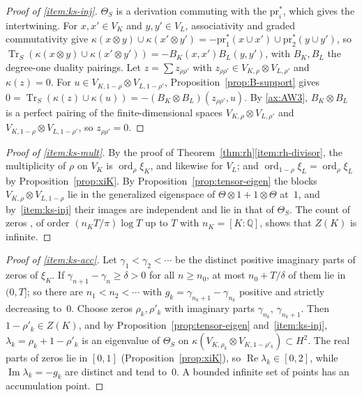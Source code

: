 \documentclass[11pt]{amsart}
\theoremstyle{plain}
\theoremstyle{definition}
\theoremstyle{remark}
\numberwithin{equation}{section}
\newcommand{\Q}{\mathbb{Q}}
\DeclareMathOperator{\Tr}{Tr}
\DeclareMathOperator{\Ima}{Im}
\DeclareMathOperator{\Rea}{Re}
\DeclareMathOperator{\ord}{ord}
\renewcommand{\Re}{\Rea}
\renewcommand{\Im}{\Ima}
\begin{document}
\begin{proof}[Proof of \ref{item:ks-inj}]
$\Theta_S$ is a derivation commuting with the $\mathrm{pr}_i^*$, which
gives the intertwining. For $x,x'\in V_K$ and $y,y'\in V_L$, associativity
and graded commutativity give $\kappa(x\otimes y)\cup
\kappa(x'\otimes y')=-\mathrm{pr}_1^*(x\cup x')\cup\mathrm{pr}_2^*
(y\cup y')$, so $\Tr_S(\kappa(x\otimes y)\cup\kappa(x'\otimes y'))=
-B_{K}(x,x')B_{L}(y,y')$, with $B_K,B_L$ the degree-one duality
pairings. Let $z=\sum z_{\rho\rho'}$ with $z_{\rho\rho'}\in
V_{K,\rho}\otimes V_{L,\rho'}$ and $\kappa(z)=0$. For $u\in V_{K,1-\rho}\otimes
V_{L,1-\rho'}$, Proposition~\ref{prop:B-support} gives
$0=\Tr_S(\kappa(z)\cup\kappa(u))=-(B_K\otimes B_L)(z_{\rho\rho'},u)$.
By \ref{ax:AW3}, $B_K\otimes B_L$ is a perfect pairing of the
finite-dimensional spaces $V_{K,\rho}\otimes V_{L,\rho'}$ and
$V_{K,1-\rho}\otimes V_{L,1-\rho'}$, so $z_{\rho\rho'}=0$.
\end{proof}

\begin{proof}[Proof of \ref{item:ks-mult}]
By the proof of Theorem~\ref{thm:rh}\ref{item:rh-divisor}, the
multiplicity of $\rho$ on $V_K$ is $\ord_\rho\xi_K$, and likewise for
$V_L$; and $\ord_{1-\rho}\xi_L=\ord_\rho\xi_L$ by
Proposition~\ref{prop:xiK}. By Proposition~\ref{prop:tensor-eigen} the
blocks $V_{K,\rho}\otimes V_{L,1-\rho}$ lie in the generalized eigenspace of
$\Theta\otimes1+1\otimes\Theta$ at~$1$, and by~\ref{item:ks-inj} their
images are independent and lie in that of $\Theta_S$. The count of
zeros \cite[p.~1]{HasanalizadeShenWong2021CountingZeros}, of order
$(n_KT/\pi)\log T$ up to $T$ with $n_K=[K:\Q]$, shows that $Z(K)$ is
infinite.
\end{proof}

\begin{proof}[Proof of \ref{item:ks-acc}]
Let $\gamma_1<\gamma_2<\cdots$ be the distinct positive imaginary parts
of zeros of $\xi_K$. If $\gamma_{n+1}-\gamma_n\ge\delta>0$ for all
$n\ge n_0$, at most $n_0+T/\delta$ of them lie in $(0,T]$; so there are
$n_1<n_2<\cdots$ with $g_k=\gamma_{n_k+1}-\gamma_{n_k}$ positive and
strictly decreasing to~$0$. Choose zeros $\rho_k,\rho'_k$ with imaginary
parts $\gamma_{n_k}$, $\gamma_{n_k+1}$. Then $1-\rho'_k\in Z(K)$, and by
Proposition~\ref{prop:tensor-eigen} and~\ref{item:ks-inj},
$\lambda_k=\rho_k+1-\rho'_k$ is an eigenvalue of $\Theta_S$ on
$\kappa(V_{K,\rho_k}\otimes V_{K,1-\rho'_k})\subset H^2$. The real parts of
zeros lie in $[0,1]$ (Proposition~\ref{prop:xiK}), so
$\Re\lambda_k\in[0,2]$, while $\Im\lambda_k=-g_k$ are distinct and tend
to~$0$. A bounded infinite set of points has an accumulation point.
\end{proof}
\end{document}
